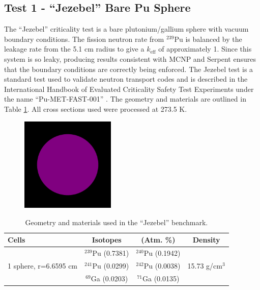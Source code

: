 \documentclass[preprint,12pt]{elsarticle}
\begin{document}
\newpage
\subsection{Test 1 - ``Jezebel'' Bare Pu Sphere}

The ``Jezebel'' criticality test is a bare plutonium/gallium sphere with vacuum boundary conditions.   The fission neutron rate from $^{239}$Pu is balanced by the leakage rate from the 5.1 cm radius to give a $k_\mathrm{eff}$ of approximately 1.  Since this system is so leaky, producing results consistent with MCNP and Serpent ensures that the boundary conditions are correctly being enforced.  The Jezebel test is a standard test used to validate neutron transport codes and is described in the International Handbook of Evaluated Criticality Safety Test Experiments under the name ``Pu-MET-FAST-001'' \cite{bench_handbook}.  The geometry and materials are outlined in Table \ref{jezebel_geom}.  All cross sections used were processed at 273.5 K.

\begin{figure}[h!] 
  \centering
    \includegraphics[width=0.4\textwidth]{graphics/jezebel-xy.png}
     \caption{  \label{jezebel_geom_pic} }
\end{figure}

\begin{table}[h]
\centering
\caption{Geometry and materials used in the ``Jezebel'' benchmark.}
\label{jezebel_geom}
\begin{tabular}{| l | c  c | c |}
\hline
Cells & Isotopes & (Atm. \%)& Density \\
\hline
\multirow{3}{*}{1 sphere, r=6.6595 cm }  &  $^{239}$Pu (0.7381)    &    $^{240}$Pu (0.1942)     &  \multirow{3}{*}{15.73 g/cm$^3$} \\
                                         &  $^{241}$Pu (0.0299)    &     $^{242}$Pu (0.0038)    &   \\
                                         &  $^{69}$Ga  (0.0203)    &     $^{71}$Ga  (0.0135)    &   \\
\hline
\end{tabular}
\end{table}
\end{document}
